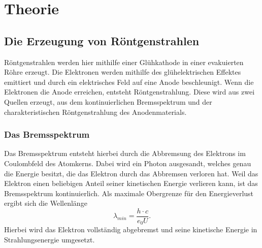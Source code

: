\section{Theorie}
\label{sec:Theorie}

\subsection{Die Erzeugung von Röntgenstrahlen}
Röntgenstrahlen werden hier mithilfe einer Glühkathode in einer evakuierten Röhre
erzeugt. Die Elektronen werden mithilfe des glühelektrischen Effektes emittiert und
durch ein elektrisches Feld auf eine Anode beschleunigt. Wenn die Elektronen die
Anode erreichen, entsteht Röntgenstrahlung. Diese wird aus zwei Quellen erzeugt,
aus dem kontinuierlichen Bremsspektrum und der charakteristischen Röntgenstrahlung
des Anodenmaterials.
\subsubsection{Das Bremsspektrum}
Das Bremsspektrum entsteht hierbei durch die Abbremsung des Elektrons im
Coulombfeld des Atomkerns. Dabei wird ein Photon ausgesandt, welches genau die
Energie besitzt, die das Elektron durch das Abbremsen verloren hat. Weil das
Elektron einen beliebigen Anteil seiner kinetischen Energie verlieren kann, ist
das Bremsspektrum kontinuierlich. Als maximale Obergrenze für den Energieverlust
ergibt sich die Wellenlänge
\begin{equation}
  \lambda_{min} = \frac{h \cdot c}{e_0 U}.
  \label{eqn:lammin}
\end{equation}
Hierbei wird das Elektron vollständig abgebremst und seine kinetische Energie in
Strahlungsenergie umgesetzt.
